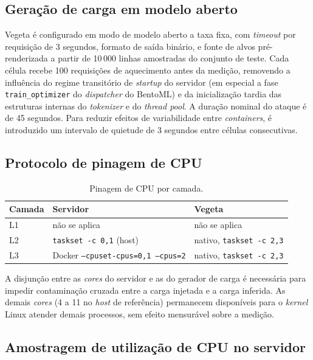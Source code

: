 \subsection{Geração de carga em modelo aberto}

Vegeta \cite{vegeta2024} é configurado em modo de modelo aberto a taxa fixa,
com \textit{timeout} por requisição de 3 segundos, formato de saída
binário, e fonte de alvos pré-renderizada a partir de 10\,000 linhas
amostradas do conjunto de teste. Cada célula recebe 100 requisições de
aquecimento antes da medição, removendo a influência do regime transitório
de \textit{startup} do servidor (em especial a fase \texttt{train\_optimizer}
do \textit{dispatcher} do BentoML) e da inicialização tardia das estruturas
internas do \textit{tokenizer} e do \textit{thread pool}. A duração nominal
do ataque é de 45 segundos. Para reduzir efeitos de variabilidade entre
\textit{containers}, é introduzido um intervalo de quietude de 3 segundos
entre células consecutivas.

\subsection{Protocolo de pinagem de CPU}

\begin{table}[H]
\centering
\caption{Pinagem de CPU por camada.}
\label{tab:pinning}
\begin{tabularx}{\textwidth}{l X X}
\toprule
Camada & Servidor & Vegeta \\
\midrule
L1 & não se aplica & não se aplica \\
L2 & \texttt{taskset -c 0,1} (host) & nativo, \texttt{taskset -c 2,3} \\
L3 & Docker \texttt{--cpuset-cpus=0,1 --cpus=2} & nativo, \texttt{taskset -c 2,3} \\
\bottomrule
\end{tabularx}
\end{table}

A disjunção entre as \textit{cores} do servidor e as do gerador de carga é
necessária para impedir contaminação cruzada entre a carga injetada e a
carga inferida. As demais \textit{cores} (4 a 11 no \textit{host} de
referência) permanecem disponíveis para o \textit{kernel} Linux atender
demais processos, sem efeito mensurável sobre a medição.

\subsection{Amostragem de utilização de CPU no servidor}

